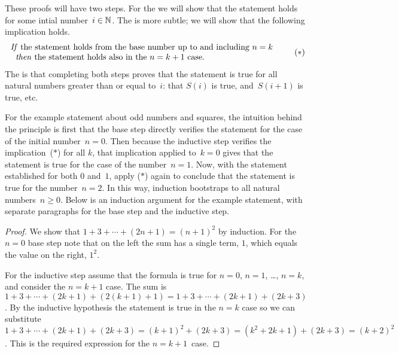 \documentclass{ibl}  %
\begin{document}
These proofs will have two steps.
For the  
we will show that the statement holds for some intial number~$i\in\mathbb{N}$.
The  is more subtle;
we will show that the following implication holds.
\begin{equation*}
  \begin{tabular}{l} 
  \textit{If} the statement holds from the
   base number up to and including $n=k$  \\
  \hspace*{0.618em}\textit{then} the statement holds also in the~$n=k+1$ case.
  \end{tabular}
  \tag{$*$}
\end{equation*}
The  is that
completing both steps proves 
that the statement is true for all natural
numbers greater than or equal to~$i$: 
that $S(i)$ is true, and~$S(i+1)$ is true, etc.

For the example statement about odd numbers and squares, 
the intuition behind the principle is first that the base step
directly verifies the statement for the case of the initial number~$n=0$.
Then because the inductive step verifies the implication~($*$) for all $k$, 
that implication applied to~$k=0$ gives 
that the statement is true for the case of the number~$n=1$. 
Now, with the statement established for both $0$ and~$1$, 
apply ($*$) again to conclude that the statement is true for the number~$n=2$.
In this way, induction bootstraps to all natural numbers~$n\geq 0$.
Below is an induction argument for the example statement, 
with separate paragraphs for the base step and the inductive step.

\begin{proof}
  We show that $1+3+\cdots+(2n+1)=(n+1)^2$ by induction.
  For the $n=0$ base step note that on the left the sum has a single term, $1$,
  which equals the value on the right, $1^2$.

  For the inductive step assume that the 
  formula is true for $n=0$, $n=1$, \ldots, $n=k$, and 
  consider the $n=k+1$ case.
  The sum is $1+3+\cdots+(2k+1)+(2(k+1)+1)=1+3+\cdots+(2k+1)+(2k+3)$.
  By the inductive hypothesis the statement is true in the $n=k$ case
  so we can substitute 
  $1+3+\cdots+(2k+1)+(2k+3)=(k+1)^2+(2k+3)=(k^2+2k+1)+(2k+3)=(k+2)^2$.
  This is the required expression for the $n=k+1$~case.
\end{proof}
\end{document}
